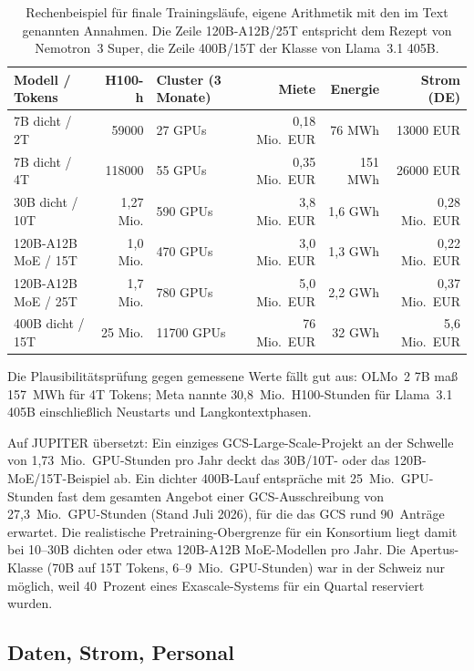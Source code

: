 \documentclass[a4paper,11pt]{article}
\begin{document}
\begin{table}[htbp]
  \centering
  \footnotesize
  \setlength{\tabcolsep}{4pt}
  \begin{tabular}{lrlrrr}
    \toprule
    Modell / Tokens & H100-h & Cluster (3 Monate) & Miete & Energie & Strom (DE) \\
    \midrule
    7B dicht / 2T & \num{59000} & 27 GPUs & 0,18 Mio.\ EUR & 76 MWh & \num{13000} EUR \\
    7B dicht / 4T & \num{118000} & 55 GPUs & 0,35 Mio.\ EUR & 151 MWh & \num{26000} EUR \\
    30B dicht / 10T & 1,27 Mio. & 590 GPUs & 3,8 Mio.\ EUR & 1,6 GWh & 0,28 Mio.\ EUR \\
    120B-A12B MoE / 15T & 1,0 Mio. & 470 GPUs & 3,0 Mio.\ EUR & 1,3 GWh & 0,22 Mio.\ EUR \\
    120B-A12B MoE / 25T & 1,7 Mio. & 780 GPUs & 5,0 Mio.\ EUR & 2,2 GWh & 0,37 Mio.\ EUR \\
    400B dicht / 15T & 25 Mio. & \num{11700} GPUs & 76 Mio.\ EUR & 32 GWh & 5,6 Mio.\ EUR \\
    \bottomrule
  \end{tabular}
  \caption{Rechenbeispiel für finale Trainingsläufe, eigene Arithmetik
    mit den im Text genannten Annahmen. Die Zeile 120B-A12B/25T
    entspricht dem Rezept von Nemotron~3 Super, die Zeile 400B/15T
    der Klasse von Llama~3.1 405B.}
  \label{tab:rechenbeispiel}
\end{table}

Die Plausibilitätsprüfung gegen gemessene Werte fällt gut aus: OLMo~2
7B maß 157~MWh für 4T Tokens; Meta nannte 30,8~Mio.\ H100-Stunden für
Llama~3.1 405B einschließlich Neustarts und Langkontextphasen.

Auf JUPITER übersetzt: Ein einziges GCS-Large-Scale-Projekt an der
Schwelle von 1,73~Mio.\ GPU-Stunden pro Jahr deckt das 30B/10T- oder
das 120B-MoE/15T-Beispiel ab. Ein dichter 400B-Lauf entspräche mit
25~Mio.\ GPU-Stunden fast dem gesamten Angebot einer
GCS-Ausschreibung von 27,3~Mio.\ GPU-Stunden (Stand Juli 2026), für
die das GCS rund 90~Anträge erwartet. Die
realistische Pretraining-Obergrenze für ein Konsortium liegt damit bei
10--30B dichten oder etwa 120B-A12B MoE-Modellen pro Jahr. Die
Apertus-Klasse (70B auf 15T Tokens, 6--9~Mio.\ GPU-Stunden) war in der
Schweiz nur möglich, weil 40~Prozent eines Exascale-Systems für ein
Quartal reserviert wurden.

\subsection{Daten, Strom, Personal}
\label{sec:dsp}
\end{document}
